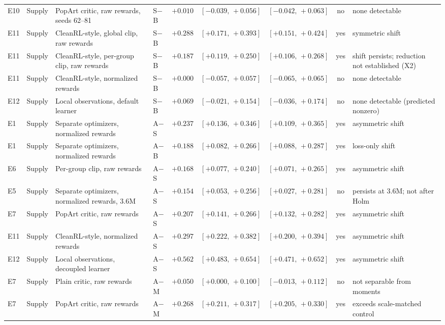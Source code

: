 \begin{table}[!htbp]
\begin{tabular}{@{}ll>{\raggedright\arraybackslash}p{}lcccc >{\raggedright\arraybackslash}p{}@{}}
E10 & Supply & PopArt critic, raw rewards, seeds 62--81 & S$-$B & $+0.010$ & $[-0.039,\,+0.056]$ & $[-0.042,\,+0.063]$ & no & none detectable \\
E11 & Supply & CleanRL-style, global clip, raw rewards & S$-$B & $+0.288$ & $[+0.171,\,+0.393]$ & $[+0.151,\,+0.424]$ & yes & symmetric shift \\
E11 & Supply & CleanRL-style, per-group clip, raw rewards & S$-$B & $+0.187$ & $[+0.119,\,+0.250]$ & $[+0.106,\,+0.268]$ & yes & shift persists; reduction not established (X2) \\
E11 & Supply & CleanRL-style, normalized rewards & S$-$B & $+0.000$ & $[-0.057,\,+0.057]$ & $[-0.065,\,+0.065]$ & no & none detectable \\
E12 & Supply & Local observations, default learner & S$-$B & $+0.069$ & $[-0.021,\,+0.154]$ & $[-0.036,\,+0.174]$ & no & none detectable (predicted nonzero) \\
E1 & Supply & Separate optimizers, normalized rewards & A$-$S & $+0.237$ & $[+0.136,\,+0.346]$ & $[+0.109,\,+0.365]$ & yes & asymmetric shift \\
E1 & Supply & Separate optimizers, normalized rewards & A$-$B & $+0.188$ & $[+0.082,\,+0.266]$ & $[+0.088,\,+0.287]$ & yes & loss-only shift \\
E6 & Supply & Per-group clip, raw rewards & A$-$S & $+0.168$ & $[+0.077,\,+0.240]$ & $[+0.071,\,+0.265]$ & yes & asymmetric shift \\
E5 & Supply & Separate optimizers, normalized rewards, 3.6M & A$-$S & $+0.154$ & $[+0.053,\,+0.256]$ & $[+0.027,\,+0.281]$ & no & persists at 3.6M; not after Holm \\
E7 & Supply & PopArt critic, raw rewards & A$-$S & $+0.207$ & $[+0.141,\,+0.266]$ & $[+0.132,\,+0.282]$ & yes & asymmetric shift \\
E11 & Supply & CleanRL-style, normalized rewards & A$-$S & $+0.297$ & $[+0.222,\,+0.382]$ & $[+0.200,\,+0.394]$ & yes & asymmetric shift \\
E12 & Supply & Local observations, decoupled learner & A$-$S & $+0.562$ & $[+0.483,\,+0.654]$ & $[+0.471,\,+0.652]$ & yes & asymmetric shift \\
E7 & Supply & Plain critic, raw rewards & A$-$M & $+0.050$ & $[+0.000,\,+0.100]$ & $[-0.013,\,+0.112]$ & no & not separable from moments \\
E7 & Supply & PopArt critic, raw rewards & A$-$M & $+0.268$ & $[+0.211,\,+0.317]$ & $[+0.205,\,+0.330]$ & yes & exceeds scale-matched control \\

\end{tabular}
\end{table}
